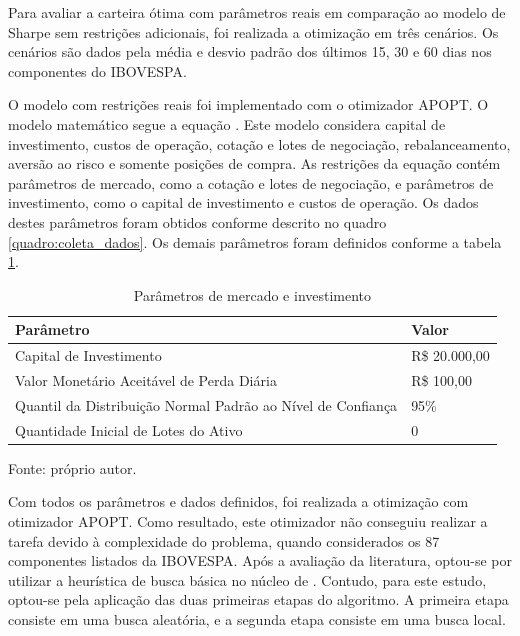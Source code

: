         \ipar Para avaliar a carteira ótima com parâmetros reais em comparação ao modelo de Sharpe sem restrições adicionais, foi realizada a otimização em três cenários. Os cenários são dados pela média e desvio padrão dos últimos 15, 30 e 60 dias nos componentes do \acrshort{IBOVESPA}. 

        \ipar O modelo com restrições reais foi implementado com o otimizador APOPT. O modelo matemático segue a equação . Este modelo considera capital de investimento, custos de operação, cotação e lotes de negociação, rebalanceamento, aversão ao risco e somente posições de compra. As restrições da equação contém parâmetros de mercado, como a cotação e lotes de negociação, e parâmetros de investimento, como o capital de investimento e custos de operação. Os dados destes parâmetros foram obtidos conforme descrito no quadro \ref{quadro:coleta_dados}. Os demais parâmetros foram definidos conforme a tabela \ref{tab:parametros}.

        \begin{table}[H]
            \centering
            \caption{Parâmetros de mercado e investimento}
            \label{tab:parametros}
            \begin{tabular}{ll}
                \hline
                \textbf{Parâmetro} & \textbf{Valor} \\
                \hline
                Capital de Investimento & R\$ 20.000,00 \\
                Valor Monetário Aceitável de Perda Diária & R\$ 100,00 \\
                Quantil da Distribuição Normal Padrão ao Nível de Confiança & 95\% \\
                Quantidade Inicial de Lotes do Ativo & 0 \\
                \hline
            \end{tabular}
            \par \footnotesize Fonte: próprio autor.
        \end{table}

        \ipar Com todos os parâmetros e dados definidos, foi realizada a otimização com otimizador APOPT. Como resultado, este otimizador não conseguiu realizar a tarefa devido à complexidade do problema, quando considerados os 87 componentes listados da \acrshort{IBOVESPA}. Após a avaliação da literatura, optou-se por utilizar a heurística de busca básica no núcleo de . Contudo, para este estudo, optou-se pela aplicação das duas primeiras etapas do algoritmo. A primeira etapa consiste em uma busca aleatória, e a segunda etapa consiste em uma busca local. 

